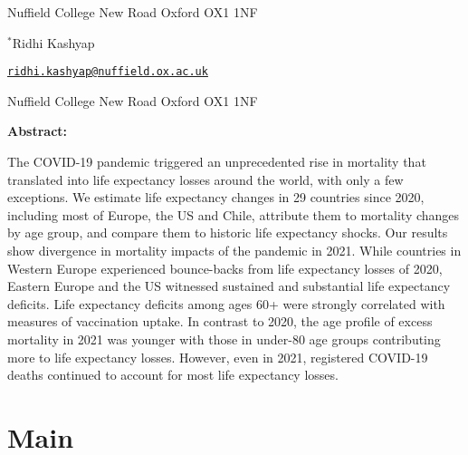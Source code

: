 \documentclass[12pt]{article}
\begin{document}
\begin{titlepage}
{Nuffield College
New Road
Oxford OX1 1NF

\vspace{1em}

$^{*}$Ridhi Kashyap

\href{mailto:ridhi.kashyap@nuffield.ox.ac.uk}{\texttt{ridhi.kashyap@nuffield.ox.ac.uk}}

Nuffield College
New Road
Oxford OX1 1NF

\par\medskip}


\clearpage

{\textbf{Abstract:}\par

The COVID-19 pandemic triggered an unprecedented rise in mortality that translated into life expectancy losses around the world, with only a few exceptions. We estimate life expectancy changes in 29 countries since 2020, including most of Europe, the US and Chile, attribute them to mortality changes by age group, and compare them to historic life expectancy shocks. Our results show divergence in mortality impacts of the pandemic in 2021. While countries in Western Europe experienced bounce-backs from life expectancy losses of 2020, Eastern Europe and the US witnessed sustained and substantial life expectancy deficits. Life expectancy deficits among ages 60+ were strongly correlated with measures of vaccination uptake. In contrast to 2020, the age profile of excess mortality in 2021 was younger with those in under-80 age groups contributing more to life expectancy losses. However, even in 2021, registered COVID-19 deaths continued to account for most life expectancy losses.

\par\medskip}

\clearpage

\end{titlepage}



\section*{Main}
\end{document}
